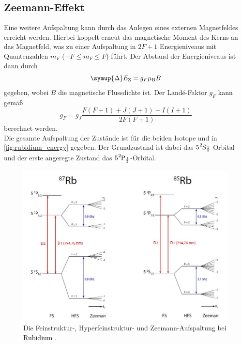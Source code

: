 \subsection{Zeemann-Effekt}
Eine weitere Aufspaltung kann durch das Anlegen eines externen Magnetfeldes erreicht werden. Hierbei koppelt erneut das magnetische Moment des Kerns
an das Magnetfeld, was zu einer Aufspaltung in $2F +1$ Energieniveaus mit Quantenzahlen $m_F$ ($-F \leq m_F \leq F$) führt. Der Abstand der Energieniveaus ist
dann durch 
\begin{equation}
    \label{eqn:E_Zeemann}
    \symup{\Delta}E_\text{Z} = g_F \mu_\text{B} B 
\end{equation}
gegeben, wobei $B$ die magnetische Flussdichte ist.
Der Landé-Faktor $g_F$ kann gemäß
\begin{equation}
              \label{eqn:g_F}
              g_F = g_J \frac{F(F+1)+J(J+1)-I(I+1)}{2F(F+1)}
\end{equation}
berechnet werden. \\
Die gesamte Aufspaltung der Zustände ist für die beiden Isotope  und  in \autoref{fig:rubidium_energy} gegeben. 
Der Grundzustand ist dabei das $5\ce{^{2}\text{S}_{\frac{1}{2}}}$-Orbital und der erste angeregte Zustand das $5\ce{^{2}\text{P}_{\frac{1}{2}}}$-Orbital.

\begin{figure}
    \centering
    \includegraphics[width = \textwidth]{"content/pics/Rubidium_energy_levels.png"}
    \caption{Die Feinstruktur-, Hyperfeinstruktur- und Zeemann-Aufspaltung bei Rubidium \cite{Rubidium_energy}.}
    \label{fig:rubidium_energy}
\end{figure}

